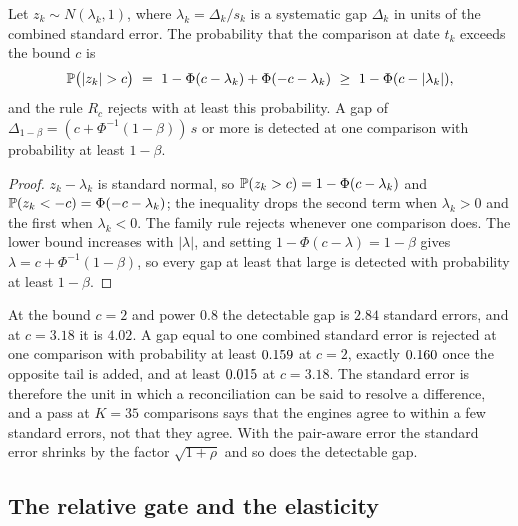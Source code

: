 \begin{proposition}\label{prop:power}
Let $z_k\sim N(\lambda_k,1)$, where $\lambda_k=\Delta_k/s_k$ is a systematic gap $\Delta_k$ in units of the combined standard error. The probability that the comparison at date $t_k$ exceeds the bound $c$ is
\begin{equation}
\Prob\bigl(\lvert z_k\rvert>c\bigr)\ =\ 1-\Phi(c-\lambda_k)+\Phi(-c-\lambda_k)\ \ge\ 1-\Phi(c-\lvert\lambda_k\rvert),
\label{eq:power-one}
\end{equation}
and the rule $R_c$ rejects with at least this probability. A gap of $\Delta_{1-\beta}=(c+\Phi^{-1}(1-\beta))\,s$ or more is detected at one comparison with probability at least $1-\beta$.
\end{proposition}
\begin{proof}
$z_k-\lambda_k$ is standard normal, so $\mathbb{P}(z_k>c)=1-\Phi(c-\lambda_k)$ and $\mathbb{P}(z_k<-c)=\Phi(-c-\lambda_k)$; the inequality drops the second term when $\lambda_k>0$ and the first when $\lambda_k<0$. The family rule rejects whenever one comparison does. The lower bound increases with $\lvert\lambda\rvert$, and setting $1-\Phi(c-\lambda)=1-\beta$ gives $\lambda=c+\Phi^{-1}(1-\beta)$, so every gap at least that large is detected with probability at least $1-\beta$. \qedhere
\end{proof}

At the bound $c=2$ and power $0.8$ the detectable gap is $2.84$ standard errors, and at $c=3.18$ it is $4.02$. A gap equal to one combined standard error is rejected at one comparison with probability at least $0.159$ at $c=2$, exactly $0.160$ once the opposite tail is added, and at least $0.015$ at $c=3.18$. The standard error is therefore the unit in which a reconciliation can be said to resolve a difference, and a pass at $K=35$ comparisons says that the engines agree to within a few standard errors, not that they agree. With the pair-aware error the standard error shrinks by the factor $\sqrt{1+\rho}$ and so does the detectable gap.

\subsection{The relative gate and the elasticity}
\label{sec:theory-gate}

